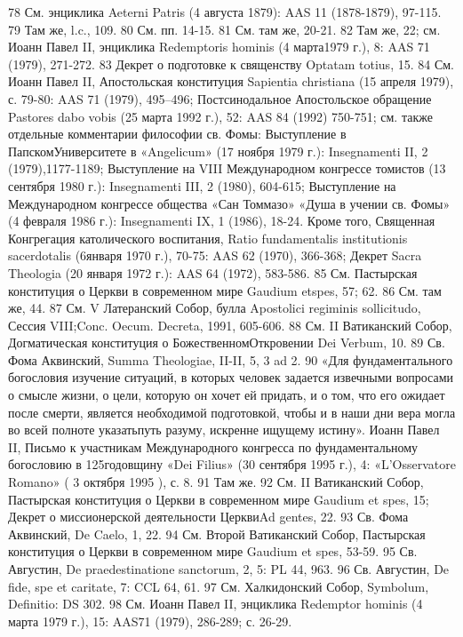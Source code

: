 \documentclass[a5paper,10pt]{article}
\begin{document}
78 См. энциклика Aeterni Patris (4 августа 1879): AAS 11 (1878-1879), 97-115.
79 Там же, l.c., 109.
80 См. пп. 14-15.
81 См. там же, 20-21.
82 Там же, 22; см. Иоанн Павел II, энциклика Redemptoris hominis (4 марта1979 г.), 8: AAS 71 (1979), 271-272.
83 Декрет о подготовке к священству Optatam totius, 15.
84 См. Иоанн Павел II, Апостольская конституция Sapientia christiana (15 апреля 1979), с. 79-80: AAS 71 (1979), 495–496; Постсинодальное Апостольское обращение Pastores dabo vobis (25 марта 1992 г.), 52: AAS 84 (1992) 750-751; см. также отдельные комментарии философии св. Фомы: Выступление в ПапскомУниверситете в «Angelicum» (17 ноября 1979 г.): Insegnamenti II, 2 (1979),1177-1189; Выступление на VIII Международном конгрессе томистов (13 сентября 1980 г.): Insegnamenti III, 2 (1980), 604-615; Выступление на Международном конгрессе общества «Сан Томмазо» «Душа в учении св. Фомы» (4 февраля 1986 г.): Insegnamenti IX, 1 (1986), 18-24. Кроме того, Священная Конгрегация католического воспитания, Ratio fundamentalis institutionis sacerdotalis (6января 1970 г.), 70-75: AAS 62 (1970), 366-368; Декрет Sacra Theologia (20 января 1972 г.): AAS 64 (1972), 583-586.
85 См. Пастырская конституция о Церкви в современном мире Gaudium etspes, 57; 62.
86 См. там же, 44.
87 См. V Латеранский Собор, булла Apostolici regiminis sollicitudo, Сессия VIII;Conc. Oecum. Decreta, 1991, 605-606.
88 См. II Ватиканский Собор, Догматическая конституция о БожественномОткровении Dei Verbum, 10.
89 Св. Фома Аквинский, Summa Theologiae, II-II, 5, 3 ad 2.
90 «Для фундаментального богословия изучение ситуаций, в которых человек задается извечными вопросами о смысле жизни, о цели, которую он хочет ей придать, и о том, что его ожидает после смерти, является необходимой подготовкой, чтобы и в наши дни вера могла во всей полноте указатьпуть разуму, искренне ищущему истину». Иоанн Павел II, Письмо к участникам Международного конгресса по фундаментальному богословию в 125годовщину «Dei Filius» (30 сентября 1995 г.), 4: «L'Osservatore Romano» ( 3 октября 1995 ), с. 8.
91 Там же.
92 См. II Ватиканский Собор, Пастырская конституция о Церкви в современном мире Gaudium et spes, 15; Декрет о миссионерской деятельности ЦерквиAd gentes, 22.
93 Св. Фома Аквинский, De Caelo, 1, 22.
94 См. Второй Ватиканский Собор, Пастырская конституция о Церкви в современном мире Gaudium et spes, 53-59.
95 Св. Августин, De praedestinatione sanctorum, 2, 5: PL 44, 963.
96 Св. Августин, De fide, spe et caritate, 7: CCL 64, 61.
97 См. Халкидонский Собор, Symbolum, Definitio: DS 302.
98 См. Иоанн Павел II, энциклика Redemptor hominis (4 марта 1979 г.), 15: AAS71 (1979), 286-289; с. 26-29.
\end{document}
